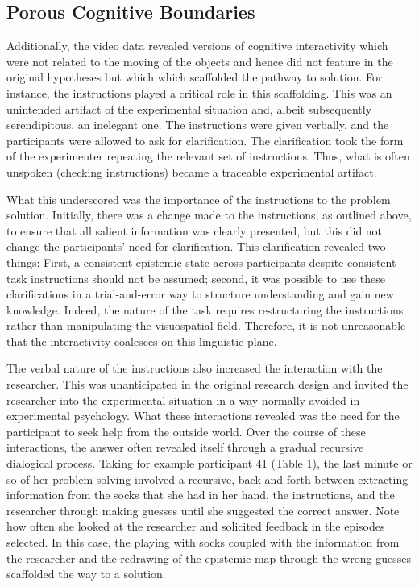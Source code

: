 {{\subsection{Porous Cognitive Boundaries}

Additionally, the video data revealed versions of cognitive interactivity which were not related to the moving of the objects and hence did not feature in the original hypotheses but which which scaffolded the pathway to solution. For instance, the instructions played a critical role in this scaffolding. This was an unintended artifact of the experimental situation and, albeit subsequently serendipitous, an inelegant one. The instructions were given verbally, and the participants were allowed to ask for clarification. The clarification took the form of the experimenter repeating the relevant set of instructions. Thus, what is often unspoken (checking instructions) became a traceable experimental artifact.

What this underscored was the importance of the instructions to the problem solution. Initially, there was a change made to the instructions, as outlined above, to ensure that all salient information was clearly presented, but this did not change the participants' need for clarification. This clarification revealed two things: First, a consistent epistemic state across participants despite consistent task instructions should not be assumed; second, it was possible to use these clarifications in a trial-and-error way to structure understanding and gain new knowledge. Indeed, the nature of the task requires restructuring the instructions rather than manipulating the visuospatial field. Therefore, it is not unreasonable that the interactivity coalesces on this linguistic plane.

The verbal nature of the instructions also increased the interaction with the researcher. This was unanticipated in the original research design and invited the researcher into the experimental situation in a way normally avoided in experimental psychology. What these interactions revealed was the need for the participant to seek help from the outside world. Over the course of these interactions, the answer often revealed itself through a gradual recursive dialogical process. Taking for example participant 41 (Table 1), the last minute or so of her problem-solving involved a recursive, back-and-forth between extracting information from the socks that she had in her hand, the instructions, and the researcher through making guesses until she suggested the correct answer. Note how often she looked at the researcher and solicited feedback in the episodes selected. In this case, the playing with socks coupled with the information from the researcher and the redrawing of the epistemic map through the wrong guesses scaffolded the way to a solution.

}}
